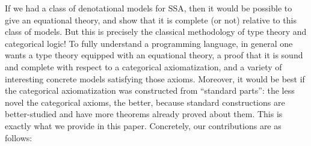 \documentclass[acmsmall,screen,review]{acmart}
\newcounter{todos}
\newcommand{\todo}[1]{\stepcounter{todos} \textcolor{red}{\textbf{TODO \arabic{todos}}: #1}}
\begin{document}
If we had a class of denotational models for SSA, then it would be possible to give an
equational theory, and show that it is complete (or not) relative to this class of models. But
this is precisely the classical methodology of type theory and categorical logic! To fully
understand a programming language, in general one wants a type theory equipped with an
equational theory, a proof that it is sound and complete with respect to a categorical
axiomatization, and a variety of interesting concrete models satisfying those axioms.
Moreover, it would be best if the categorical axiomatization was constructed from ``standard
parts'': the less novel the categorical axioms, the better, because standard constructions
are better-studied and have more theorems already proved about them. 
%
%
%
%
This is exactly what we provide in this paper. Concretely, our contributions are as follows: 
\end{document}
